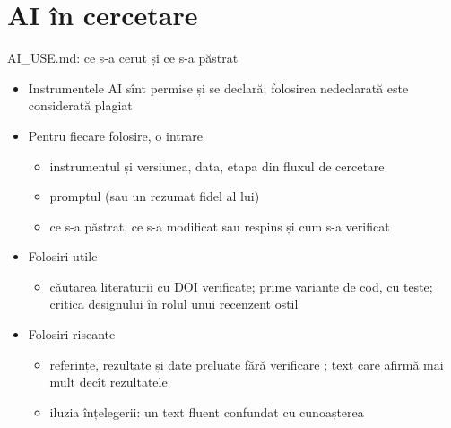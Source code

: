 \section{AI în cercetare}

\begin{frame}{AI\_USE.md: ce s-a cerut și ce s-a păstrat}
\itemsize{\small}
\begin{itemize}
    \item Instrumentele AI sînt permise și se declară; folosirea nedeclarată este considerată plagiat
    \item Pentru fiecare folosire, o intrare
    \begin{itemize}
        \item instrumentul și versiunea, data, etapa din fluxul de cercetare
        \item promptul (sau un rezumat fidel al lui)
        \item ce s-a păstrat, ce s-a modificat sau respins și cum s-a verificat
    \end{itemize}
    \item Folosiri utile
    \begin{itemize}
        \item căutarea literaturii cu DOI verificate; prime variante de cod, cu teste; critica designului în rolul unui recenzent ostil 
    \end{itemize}
    \item Folosiri riscante
    \begin{itemize}
        \item referințe, rezultate și date preluate fără verificare ; text care afirmă mai mult decît rezultatele
        \item iluzia înțelegerii: un text fluent confundat cu cunoașterea 
    \end{itemize}
\end{itemize}
\end{frame}

